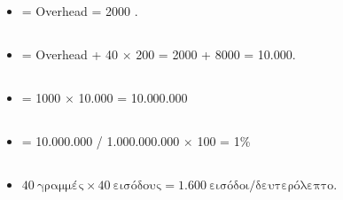 \documentclass{article}
\begin{document}
\vspace{0.234567cm}

\subsection*{}
\begin{itemize}
\item {} = \textlatin{Overhead} = 2000 .
\end{itemize}

\subsection*{}
\begin{itemize}
\item  {} = \textlatin{Overhead} + 40 $\times$ 200 = 2000 + 8000 = 10.000.
\end{itemize}

\subsection*{} 
\begin{itemize}
\item {} = 1000 $\times$ 10{.}000 = 10{.}000{.}000
\end{itemize}

\subsection*{} 
\begin{itemize}
\item {} = {10.000.000} / {1.000.000.000} $\times$ 100 = {1\%}
\end{itemize}
 

\subsection*{}

\begin{itemize}
    \item {} $40~\text{γραμμές} \times 40~\text{εισόδους} = 1.600~\text{εισόδοι/δευτερόλεπτο}$.
\end{itemize}
\end{document}
